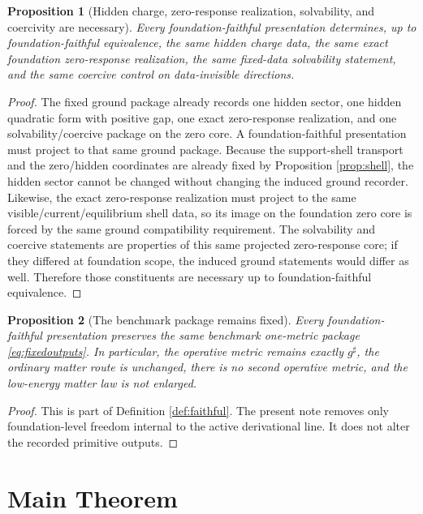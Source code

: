\documentclass[11pt]{article}
\newcommand{\CompletedMetric}{g^{\sharp}}
\newtheorem{proposition}{Proposition}
\begin{document}
\begin{proposition}[Hidden charge, zero-response realization, solvability, and coercivity are necessary]
\label{prop:hidden}
Every foundation-faithful presentation determines, up to foundation-faithful equivalence, the same hidden charge data, the same exact foundation zero-response realization, the same fixed-data solvability statement, and the same coercive control on data-invisible directions.
\end{proposition}

\begin{proof}
The fixed ground package already records one hidden sector, one hidden quadratic form with positive gap, one exact zero-response realization, and one solvability/coercive package on the zero core. A foundation-faithful presentation must project to that same ground package. Because the support-shell transport and the zero/hidden coordinates are already fixed by Proposition \ref{prop:shell}, the hidden sector cannot be changed without changing the induced ground recorder. Likewise, the exact zero-response realization must project to the same visible/current/equilibrium shell data, so its image on the foundation zero core is forced by the same ground compatibility requirement. The solvability and coercive statements are properties of this same projected zero-response core; if they differed at foundation scope, the induced ground statements would differ as well. Therefore those constituents are necessary up to foundation-faithful equivalence.
\end{proof}

\begin{proposition}[The benchmark package remains fixed]
\label{prop:benchmark}
Every foundation-faithful presentation preserves the same benchmark one-metric package \eqref{eq:fixedoutputs}. In particular, the operative metric remains exactly \(\CompletedMetric\), the ordinary matter route is unchanged, there is no second operative metric, and the low-energy matter law is not enlarged.
\end{proposition}

\begin{proof}
This is part of Definition \ref{def:faithful}. The present note removes only foundation-level freedom internal to the active derivational line. It does not alter the recorded primitive outputs.
\end{proof}

\section{Main Theorem}
\end{document}
